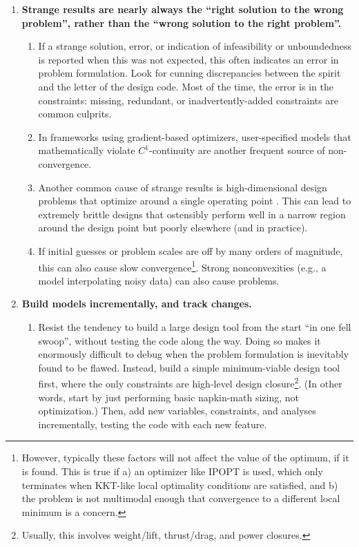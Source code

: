 \begin{enumerate}
\begin{enumerate}
        \item Consider robustness early. In nature\footnote{Mother Nature being arguably history's most successful optimizer}, optima are usually not near extremes.
    \end{enumerate}
    \item \textbf{Strange results are nearly always the ``right solution to the wrong problem'', rather than the ``wrong solution to the right problem''.}
    \begin{enumerate}
        \item If a strange solution, error, or indication of infeasibility or unboundedness is reported when this was not expected, this often indicates an error in problem formulation. Look for cunning discrepancies between the spirit and the letter of the design code. Most of the time, the error is in the constraints: missing, redundant, or inadvertently-added constraints are common culprits.
        \item In frameworks using gradient-based optimizers, user-specified models that mathematically violate $C^1$-continuity are another frequent source of non-convergence.
        \item Another common cause of strange results is high-dimensional design problems that optimize around a single operating point \cite{drela_pros_1998}. This can lead to extremely brittle designs that ostensibly perform well in a narrow region around the design point but poorly elsewhere (and in practice).
        \item If initial guesses or problem scales are off by many orders of magnitude, this can also cause slow convergence\footnote{However, typically these factors will not affect the value of the optimum, if it is found. This is true if a) an optimizer like IPOPT is used, which only terminates when KKT-like local optimality conditions are satisfied, and b) the problem is not multimodal enough that convergence to a different local minimum is a concern.}. Strong nonconvexities (e.g., a model interpolating noisy data) can also cause problems.
    \end{enumerate}
    \item \textbf{Build models incrementally, and track changes.}
    \begin{enumerate}
        \item Resist the tendency to build a large design tool from the start ``in one fell swoop'', without testing the code along the way. Doing so makes it enormously difficult to debug when the problem formulation is inevitably found to be flawed. Instead, build a simple minimum-viable design tool first, where the only constraints are high-level design closure\footnote{Usually, this involves weight/lift, thrust/drag, and power closures.}. (In other words, start by just performing basic napkin-math sizing, not optimization.) Then, add new variables, constraints, and analyses incrementally, testing the code with each new feature.

\end{enumerate}
\end{enumerate}
